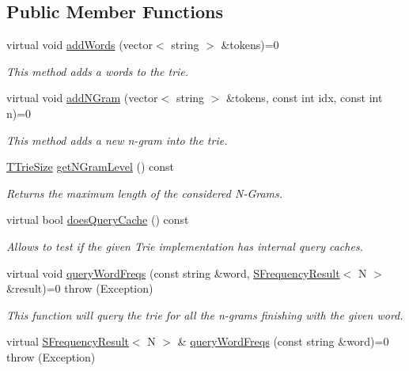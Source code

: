 \subsection*{Public Member Functions}
\begin{DoxyCompactItemize}
\item 
virtual void \hyperlink{classtries_1_1_a_trie_a337e8d59dcc31c7dc32a9e2c336c1007}{add\+Words} (vector$<$ string $>$ \&tokens)=0
\begin{DoxyCompactList}\small\item\em This method adds a words to the trie. \end{DoxyCompactList}\item 
virtual void \hyperlink{classtries_1_1_a_trie_a4969240cf320883567c59df02efee9bb}{add\+N\+Gram} (vector$<$ string $>$ \&tokens, const int idx, const int n)=0
\begin{DoxyCompactList}\small\item\em This method adds a new n-\/gram into the trie. \end{DoxyCompactList}\item 
\hyperlink{namespacetries_a621e8987880c3e13fa029a65336b920c}{T\+Trie\+Size} \hyperlink{classtries_1_1_a_trie_a9132a4c31ad78775b421fbc8d6ea8e84}{get\+N\+Gram\+Level} () const 
\begin{DoxyCompactList}\small\item\em Returns the maximum length of the considered N-\/\+Grams. \end{DoxyCompactList}\item 
virtual bool \hyperlink{classtries_1_1_a_trie_a25c67327203de6c199f8aeb813ad677a}{does\+Query\+Cache} () const 
\begin{DoxyCompactList}\small\item\em Allows to test if the given Trie implementation has internal query caches. \end{DoxyCompactList}\item 
virtual void \hyperlink{classtries_1_1_a_trie_a3231651cbb5921e2b374ee5fd1260667}{query\+Word\+Freqs} (const string \&word, \hyperlink{structtries_1_1_s_frequency_result}{S\+Frequency\+Result}$<$ N $>$ \&result)=0  throw (\+Exception)
\begin{DoxyCompactList}\small\item\em This function will query the trie for all the n-\/grams finishing with the given word. \end{DoxyCompactList}\item 
virtual \hyperlink{structtries_1_1_s_frequency_result}{S\+Frequency\+Result}$<$ N $>$ \& \hyperlink{classtries_1_1_a_trie_ab6826c87fd6dd5037bd562e62fe94e9a}{query\+Word\+Freqs} (const string \&word)=0  throw (\+Exception)

\end{DoxyCompactItemize}
